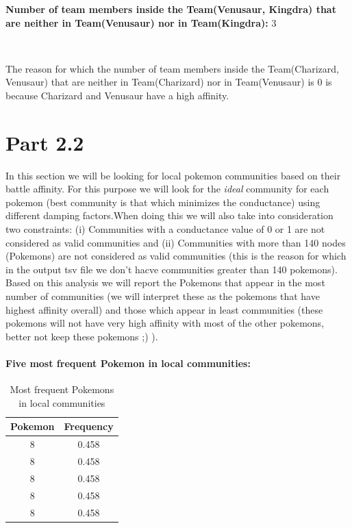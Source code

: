 \documentclass[10pt]{article}
\begin{document}
\textbf{Number of team members inside the Team(Venusaur, Kingdra) that are neither in Team(Venusaur) nor in Team(Kingdra):} 3

\

The reason for which the number of team members inside the Team(Charizard, Venusaur) that are neither in Team(Charizard) nor in Team(Venusaur) is 0 is because Charizard and Venusaur have a high affinity.

\section{Part 2.2}

In this section we will be looking for local pokemon communities based on their battle affinity. For this purpose we will look for the \textit{ideal} community for each pokemon (best community is that which minimizes the conductance) using different damping factors.When doing this we will also take into consideration two constraints: (i) Communities with a conductance value of 0 or 1 are not considered as valid communities and (ii) Communities with more than 140 nodes (Pokemons) are not considered as valid communities (this is the reason for which in the output tsv file we don't hacve communities greater than 140 pokemons). Based on this analysis we will report the Pokemons that appear in the most number of communities (we will interpret these as the pokemons that have highest affinity overall) and those which appear in least communities (these pokemons will not have very high affinity with most of the other pokemons, better not keep these pokemons ;) ).

\paragraph{Five most frequent Pokemon in local communities:}

\begin{table}[H]
\centering
\begin{tabular}{|c|c|}
\hline
\multicolumn{1}{|l|}{\textbf{Pokemon}} &
  \multicolumn{1}{l|}{\textbf{Frequency}} \\ \hline
8  & 0.458 \\ \hline
8  & 0.458 \\ \hline
8  & 0.458 \\ \hline
8  & 0.458 \\ \hline
8  & 0.458 \\ \hline
\end{tabular}
\caption{Most frequent Pokemons in local communities}
\label{tab:my-table}
\end{table}
\end{document}
